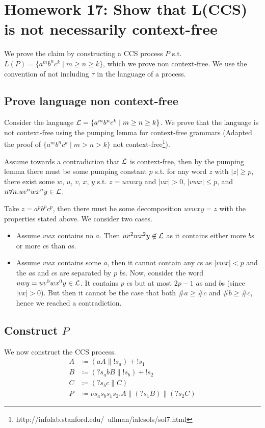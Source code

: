 \section{Homework 17: Show that L(CCS) is not necessarily context-free}

We prove the claim by constructing a CCS process $P$ s.t. $L(P) = \{a^mb^nc^k \mid m \geq n \geq k\}$, which we prove non context-free. We use the convention of not including $\tau$ in the language of a process.

\subsection{Prove language non context-free}
Consider the language $\mathcal{L} = \{a^mb^nc^k \mid m \geq n \geq k\}$. We prove that the language is not context-free using the pumping lemma for context-free grammars (Adapted the proof of $\{a^mb^nc^k \mid m > n > k\}$ not context-free\footnote{http://infolab.stanford.edu/~ullman/ialcsols/sol7.html}).

Assume towards a contradiction that $\mathcal{L}$ is context-free, then by the pumping lemma there must be some pumping constant $p$ s.t. for any word $z$ with $|z| \geq p$, there exist some $w$, $u$, $v$, $x$, $y$ s.t. $z = uvwxy$ and $|vx| > 0$, $|vwx| \leq p$, and $n\forall n. uv^nwx^ny \in \mathcal{L}$.

Take $z = a^pb^pc^p$, then there must be some decomposition $uvwxy = z$ with the properties stated above. We consider two cases.
\begin{itemize}
  \item[a)] Assume $vwx$ contains no $a$. Then $uv^2wx^2y \not\in \mathcal{L}$ as it contains either more $b$s or more $c$s than $a$s.
  \item[b)] Assume $vwx$ contains some $a$, then it cannot contain any $c$s as $|vwx| < p$ and the $a$s and $c$s are separated by $p$ $b$s. Now, consider the word $uwy = uv^0wx^0y \in \mathcal{L}$. It contains $p$ $c$s but at most $2p - 1$ $a$s and $b$s (since $|vx| > 0$). But then it cannot be the case that both $\#a \geq \#c$ and $\#b \geq \#c$, hence we reached a contradiction.
\end{itemize}
\subsection{Construct $P$}
We now construct the CCS process.
\begin{align*}
  A &\coloneqq (aA \parallel !s_a) + !s_1 \\
  B &\coloneqq (?s_abB \parallel !s_b) + !s_2 \\
  C &\coloneqq (?s_b c \parallel C) \\
  P &\coloneqq \nu s_a s_b s_1 s_2. A \parallel (?s_1B) \parallel (?s_2C)
\end{align*}

